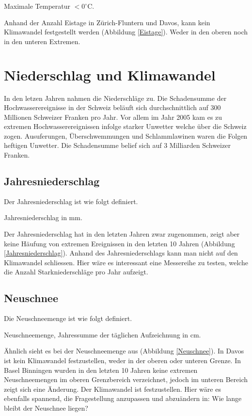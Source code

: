 \begin{refsection}
\begin{definition}
Maximale Temperatur $< 0^{\circ}$C.
\end{definition}

Anhand der Anzahl Eistage in Zürich-Fluntern und Davos, kann kein Klimawandel festgestellt werden (Abbildung \ref{Eistage}). Weder in den oberen noch in den unteren Extremen. 


\section{Niederschlag und Klimawandel}
In den letzen Jahren nahmen die Niederschläge zu. Die Schadensumme der Hochwasserereignisse in der Schweiz beläuft sich durchschnittlich auf 300 Millionen Schweizer Franken pro Jahr. Vor allem im Jahr 2005 kam es zu extremen Hochwasserereignissen infolge starker Unwetter welche über die Schweiz zogen. Ausuferungen, Überschwemmungen und Schlammlawinen waren die Folgen heftigen Unwetter. Die Schadensumme belief sich auf 3 Milliarden Schweizer Franken. 


\subsection{Jahresniederschlag}
%
Der Jahresniederschlag ist wie folgt definiert.

\begin{definition}
Jahresniederschlag in mm.
\end{definition}

Der Jahresniederschlag hat in den letzten Jahren zwar zugenommen, zeigt aber keine Häufung von extremen Ereignissen in den letzten 10 Jahren (Abbildung \ref{Jahresniederschlag}). Anhand des Jahresniederschlags kann man nicht auf den Klimawandel schliessen. Hier wäre es interessant eine Messereihe zu testen, welche die Anzahl Starkniederschläge pro Jahr aufzeigt.


\subsection{Neuschnee}
%
Die Neuschneemenge ist wie folgt definiert.

\begin{definition}
Neuschneemenge, Jahressumme der täglichen Aufzeichnung in cm.
\end{definition}

Ähnlich sieht es bei der Neuschneemenge aus (Abbildung \ref{Neuschnee}). In Davos ist kein Klimawandel festzustellen, weder in der oberen oder unteren Grenze. In Basel Binningen wurden in den letzten 10 Jahren keine extremen Neuschneemengen im oberen Grenzbereich verzeichnet, jedoch im unteren Bereich zeigt sich eine Änderung. Der Klimawandel ist festzustellen.
Hier wäre es ebenfalls spannend, die Fragestellung anzupassen und abzuändern in: Wie lange bleibt der Neuschnee liegen?



\end{refsection}
